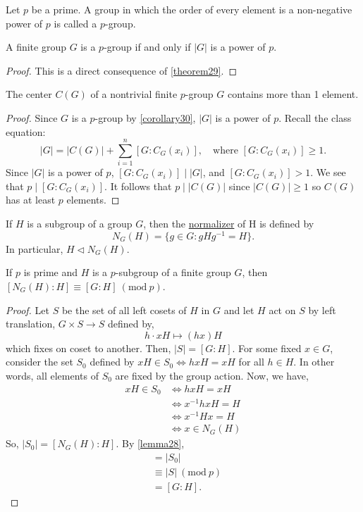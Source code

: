 \documentclass[11pt]{article}
\newcommand{\Mod}[1]{\ (\mathrm{mod}\ #1)}
\begin{document}
\begin{definition}
Let $p$ be a prime. A group in which the order of every element is a
non-negative power of $p$ is called a $p$-group. 
\end{definition}
\begin{corollary}
A finite group $G$ is a $p$-group if and only if $|G|$ is a power of $p$.
\label{corollary30}
\end{corollary}
\begin{proof}
This is a direct consequence of \cref{theorem29}.
\end{proof}
\begin{lemma}
The center $C(G)$ of a nontrivial finite $p$-group $G$ contains more than 1
element.
\label{lemma31}
\end{lemma}
\begin{proof}
Since $G$ is a $p$-group by \cref{corollary30}, $|G|$ is a power of $p$. Recall
the class equation:
\begin{equation*}
|G|=|C(G)|+\sum_{i=1}^n[G:C_G(x_i)], \quad\text{where } [G:C_G(x_i)]\geq 1.
\end{equation*}
Since $|G|$ is a power of $p$, $[G:C_G(x_i)]\mid|G|$, and $[G:C_G(x_i)]>1$. We
see that $p \mid [G:C_G(x_i)]$. It follows that $p \mid |C(G)|$ since
$|C(G)|\geq1$ so $C(G)$ has at least $p$ elements.
\end{proof}
\begin{definition}
If $H$ is a subgroup of a group $G$, then the \underline{normalizer} of H is
defined by
\begin{equation*}
N_G(H) = \{g \in G:gHg^{-1} = H\}.
\end{equation*}
In particular, $H \triangleleft N_G(H)$.
\end{definition}
\begin{lemma}
If $p$ is prime and $H$ is a $p$-subgroup of a finite group $G$, then
$[N_G(H):H] \equiv [G:H] \Mod{p}$.
\label{lemma32}
\end{lemma}
\begin{proof}
Let $S$ be the set of all left cosets of $H$ in $G$ and let $H$ act on $S$ by
left translation, $G \times S \to S$ defined by,
\begin{equation*}
h\cdot xH \mapsto (hx)H
\end{equation*}
which fixes on coset to another. Then, $|S| = [G:H]$. For some fixed $x \in G$,
consider the set $S_0$ defined by $xH \in S_0 \iff hxH = xH$ for all $h \in H$.
In other words, all elements of $S_0$ are fixed by the group action. Now, we
have,
\begin{align*}
xH \in S_0 &\iff hxH = xH\\
&\iff x^{-1}hxH = H\\
&\iff x^{-1}Hx = H\\
&\iff x \in N_G(H)
\end{align*}
So, $|S_0| = [N_G(H):H]$. By \cref{lemma28},
\begin{align*}
[N_G(H):H] &= |S_0|\\
&\equiv |S| \Mod{p}\\
&= [G:H].
\end{align*}
\end{proof}
\end{document}
